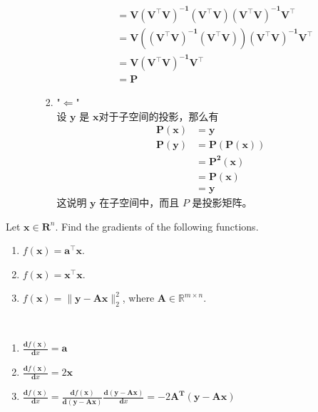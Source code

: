 \documentclass[11pt,letter,notitlepage]{article}
\begin{document}
\begin{solution}
\begin{enumerate}
\begin{enumerate}
\begin{enumerate}
\begin{align*}
					& = \mathbf{V(V^{\top}V)^{-1}(V^{\top}V)(V^{\top}V)^{-1}V^{\top}}\\
					& = \mathbf{V((V^{\top}V)^{-1}(V^{\top}V))(V^{\top}V)^{-1}V^{\top}}\\
					& = \mathbf{V(V^{\top}V)^{-1}V^{\top}}\\
					& = \mathbf{P}
				\end{align*}
				\item "$\Leftarrow$" \\
				设 $\mathbf{y}$ 是 $\mathbf{x}$对于子空间的投影，那么有 
				\begin{align*}
					\mathbf{P(x)} & =\mathbf{y}\\
					\mathbf{P(y)} & = \mathbf{P(P(x))}\\
					& = \mathbf{P^2(x)} \\
					& = \mathbf{P(x)}\\
					& = \mathbf{y}
				\end{align*}
				这说明 $\mathbf{y}$ 在子空间中，而且 $P$ 是投影矩阵。
					
			\end{enumerate}
		\end{enumerate}
	\end{enumerate}
\end{solution}

\newpage

\begin{exercise} 
	Let $\mathbf{x}\in \mathbf{R}^n$. Find the gradients of the following functions.
	\begin{enumerate}
	    \item $f(\mathbf{x}) = \mathbf{a}^{\top}\mathbf{x}$.
	    \item $f(\mathbf{x}) = \mathbf{x}^{\top}\mathbf{x}$.
	    \item $f(\mathbf{x})=\| \mathbf{y} - \mathbf{A}\mathbf{x} \|_2^2$, where $\mathbf{A}\in\mathbb{R}^{m\times n}$.
	\end{enumerate}
\end{exercise}

\begin{solution}
	\heiti
	\ \\
	\begin{enumerate}
		\item $\frac{\mathbf{d}f(\mathbf{x})}{\mathbf{d}x} = \mathbf{a}$
		\item $\frac{\mathbf{d}f(\mathbf{x})}{\mathbf{d}x} = 2\mathbf{x}$
		\item $\frac{\mathbf{d}f(\mathbf{x})}{\mathbf{d}x} = \frac{\mathbf{d}f(\mathbf{x})}{\mathbf{d}(\mathbf{y} - \mathbf{A}\mathbf{x})}  \frac{\mathbf{d}(\mathbf{y} - \mathbf{A}\mathbf{x})}{\mathbf{d}x} = - 2 \mathbf{A}^\mathbf{T} (\mathbf{y} - \mathbf{A}\mathbf{x})$
	\end{enumerate}
\end{solution}
\newpage
\end{document}
